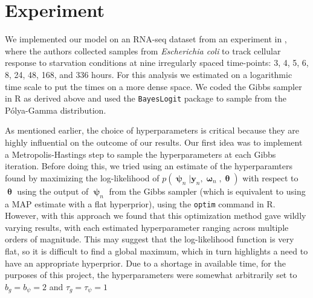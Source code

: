 \documentclass[11pt]{article}
\newcommand{\1}{\mathbf{1}}
\newcommand{\0}{\mathbf{0}}
\newcommand{\y}{\mathbf{y}}
\begin{document}

\section{Experiment}\label{Experiment}

We implemented our model on an RNA-seq dataset from an experiment in \cite{Houser}, where the authors collected samples from \emph{Escherichia coli} to track cellular response to starvation conditions at nine irregularly spaced time-points: 3, 4, 5, 6, 8, 24, 48, 168, and 336 hours. For this analysis we estimated on a logarithmic time scale to put the times on a more dense space. We coded the Gibbs sampler in \textsf{R} as derived above and used the \texttt{BayesLogit} package \cite{PG} to sample from the P\'{o}lya-Gamma distribution.

As mentioned earlier, the choice of hyperparameters is critical because they are highly influential on the outcome of our results. Our first idea was to implement a Metropolis-Hastings step to sample the hyperparameters at each Gibbs iteration. Before doing this, we tried using an estimate of the hyperparamters found by maximizing the log-likelihood of $p(\bm{\uppsi}_{n} | \y_{n}, \bm{\upomega}_{n}, \bm{\uptheta})$ with respect to $\bm{\uptheta}$ using the output of $\bm{\uppsi}_n$ from the Gibbs sampler (which is equivalent to using a MAP estimate with a flat hyperprior), using the \texttt{optim} command in \textsf{R}. However, with this approach we found that this optimization method gave wildly varying results, with each estimated hyperparameter ranging across multiple orders of magnitude. This may suggest that the log-likelihood function is very flat, so it is difficult to find a global maximum, which in turn highlights a need to have an appropriate hyperprior. Due to a shortage in available time, for the purposes of this project, the hyperparameters were somewhat arbitrarily set to $b_g = b_\psi = 2$ and $\tau_g = \tau_\psi = 1$ 
\end{document}
